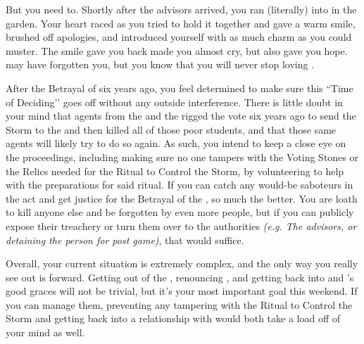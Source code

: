 \documentclass[char]{GL2020}
\begin{document}
But you need to. Shortly after the advisors arrived, you ran (literally) into \cHeadScientist{} in the garden. Your heart raced as you tried to hold it together and gave \cHeadScientist{} a warm smile, brushed off \cHeadScientist{\their} apologies, and introduced yourself with as much charm as you could muster. The smile \cHeadScientist{} gave you back made you almost cry, but also gave you hope. \cHeadScientist{} may have forgotten you, but you know that you will never stop loving \cHeadScientist{\them}.

After the Betrayal of six years ago, you feel determined to make sure this ``Time of Deciding’’ goes off without any outside interference. There is little doubt in your mind that agents from the \pTech{} and the \pFarm{} rigged the vote six years ago to send the Storm to the \pShip{} and then killed all of those poor students, and that those same agents will likely try to do so again. As such, you intend to keep a close eye on the proceedings, including making sure no one tampers with the Voting Stones or the Relics needed for the Ritual to Control the Storm, by volunteering to help with the preparations for said ritual. If you can catch any would-be saboteurs in the act and get justice for the Betrayal of the \pShip{}, so much the better. You are loath to kill anyone else and be forgotten by even more people, but if you can publicly expose their treachery or turn them over to the \pShip{} authorities \emph{(e.g. The advisors, or detaining the person for post game)}, that would suffice.

Overall, your current situation is extremely complex, and the only way you really see out is forward. Getting out of the \pGoaties{}, renouncing \cGenesis{}, and getting back into \cEbb{} and \cFlow{}'s good graces will not be trivial, but it's your most important goal this weekend. If you can manage them, preventing any tampering with the Ritual to Control the Storm and getting back into a relationship with \cHeadScientist{} would both take a load off of your mind as well.
\end{document}
